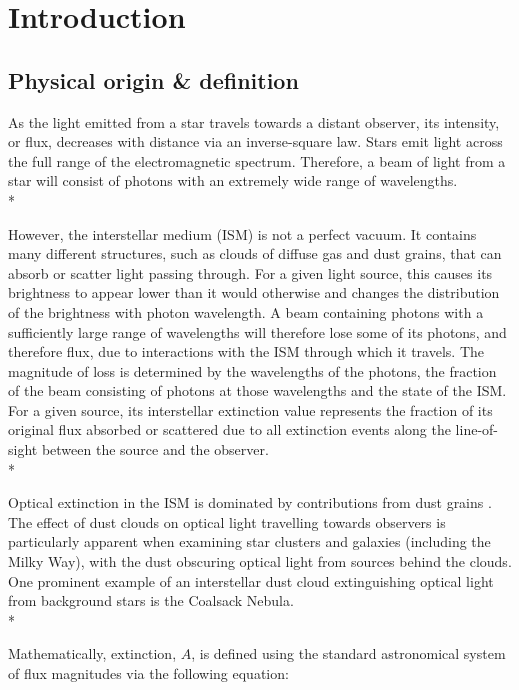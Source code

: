 \documentclass[12pt, a4paper]{report}
\begin{document}
\chapter{Introduction}
\section{Physical origin \& definition} \label{phys_origin}
As the light emitted from a star travels towards a distant observer, its intensity, or flux, decreases with distance via an inverse-square law. Stars emit light across the full range of the electromagnetic spectrum. Therefore, a beam of light from a star will consist of photons with an extremely wide range of wavelengths. \\*

However, the interstellar medium (ISM) is not a perfect vacuum. It contains many different structures, such as clouds of diffuse gas and dust grains, that can absorb or scatter light passing through. For a given light source, this causes its brightness to appear lower than it would otherwise and changes the distribution of the brightness with photon wavelength. A beam containing photons with a sufficiently large range of wavelengths will therefore lose some of its photons, and therefore flux, due to interactions with the ISM through which it travels. The magnitude of loss is determined by the wavelengths of the photons, the fraction of the beam consisting of photons at those wavelengths and the state of the ISM. For a given source, its interstellar extinction value represents the fraction of its original flux absorbed or scattered due to all extinction events along the line-of-sight between the source and the observer.\\*

Optical extinction in the ISM is dominated by contributions from dust grains \citep{2016Ap.....59..548G}. The effect of dust clouds on optical light travelling towards observers is particularly apparent when examining star clusters and galaxies (including the Milky Way), with the dust obscuring optical light from sources behind the clouds. One prominent example of an interstellar dust cloud extinguishing optical light from background stars is the Coalsack Nebula. \\*

Mathematically, extinction, $A$, is defined using the standard astronomical system of flux magnitudes via the following equation:
\end{document}
